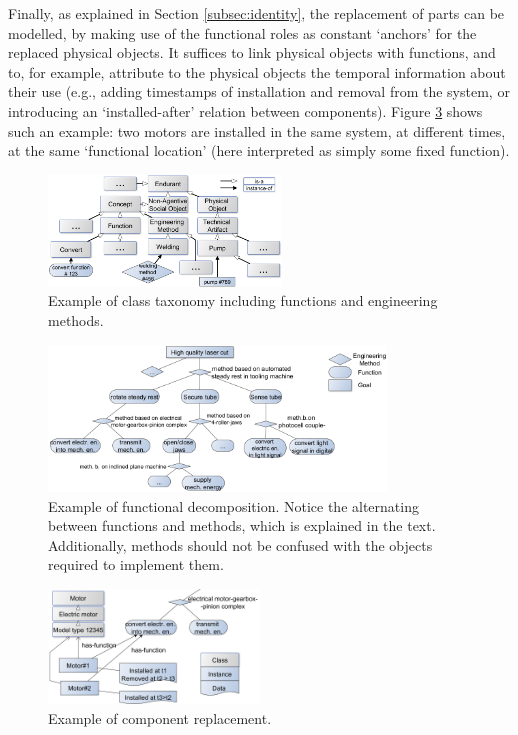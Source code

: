 \documentclass[
]{ceurart}
\begin{document}
Finally, as explained in Section \ref{subsec:identity}, the replacement of parts can be modelled, by making use of the functional roles as constant `anchors' for the replaced physical objects. It suffices to link physical objects with functions, and to, for example, attribute to the physical objects the temporal information about their use (e.g., adding timestamps of installation and removal from the system, or introducing an `installed-after' relation between components). Figure \ref{fig:replacement} shows such an example: two motors are installed in the same system, at different times, at the same `functional location' (here interpreted as simply some fixed function).

\begin{figure}
  \centering
  \includegraphics[width=0.55\textwidth]{class-taxonomy-small.png}
  \caption{\label{fig:class-taxonomy} Example of class taxonomy including functions and engineering methods.
  }
\end{figure}
\begin{figure}
  \centering
  \includegraphics[width=0.80\textwidth]{functional-decomposition-small-2.png}
  \caption{\label{fig:functional-decomposition} Example of functional decomposition. Notice the alternating between functions and methods, which is explained in the text. Additionally, methods should not be confused with the objects required to implement them.}
\end{figure}
\begin{figure}
  \centering
  \includegraphics[width=0.50\textwidth]{functional-decomposition-with-replacement-small.png}
  \caption{\label{fig:replacement} Example of component replacement.}
\end{figure}
\end{document}
